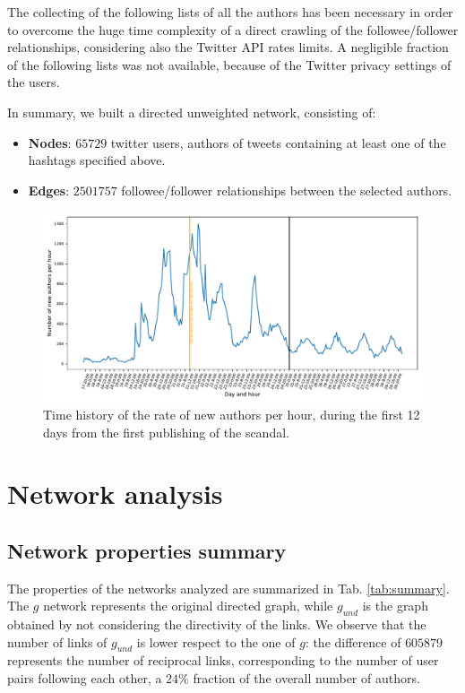 \documentclass[11pt, twoside]{report}
\begin{document}
    The collecting of the following lists of all the authors has been necessary in order to overcome the huge time complexity of a direct crawling of the
    followee/follower relationships, considering also the Twitter API rates limits. A negligible fraction of the following lists was not available, because of the Twitter privacy settings of the users.

    In summary, we built a directed unweighted network, consisting of:

    \begin{itemize}
    \item \textbf{Nodes}: $65729$ twitter users, authors of tweets containing at least one of the hashtags specified above.

    \item \textbf{Edges}: $2501757$ followee/follower relationships between the selected authors.
    \end{itemize}

    
    \begin{figure}[htbp]
      \centering
\includegraphics[width=\textwidth]{../../scripts/network_analysis/imgs/time_history.pdf}
      \caption{Time history of the rate of new authors per hour, during the first 12 days from the first publishing of the scandal.}
      \label{fig:time_history}
    \end{figure}



    
    \chapter{Network analysis}
\section{Network properties summary} 


The properties of the networks analyzed are summarized in Tab. \ref{tab:summary}. The $g$ network represents the original directed graph, while
$g_{und}$ is the graph obtained by not considering the directivity of the links. We observe that the number of links of $g_{und}$ is lower respect to the one of $g$: the difference of $605879$ represents the number of reciprocal links, corresponding to the number of user pairs following each other, a $24\%$ fraction of the overall number of authors.
\end{document}
